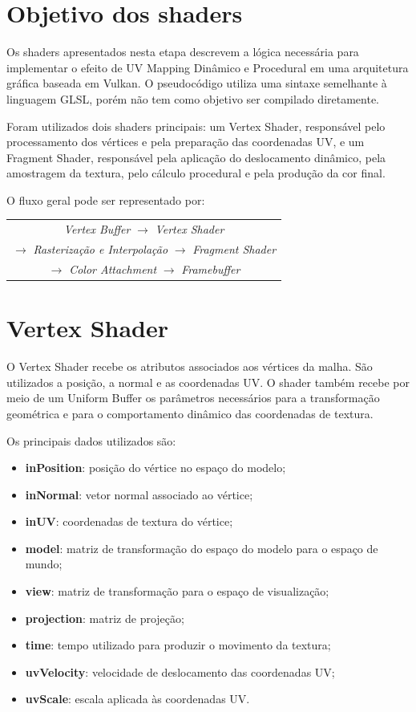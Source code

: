 \section{Objetivo dos shaders}

Os shaders apresentados nesta etapa descrevem a lógica necessária para
implementar o efeito de UV Mapping Dinâmico e Procedural em uma arquitetura
gráfica baseada em Vulkan. O pseudocódigo utiliza uma sintaxe semelhante à
linguagem GLSL, porém não tem como objetivo ser compilado diretamente.

Foram utilizados dois shaders principais: um Vertex Shader, responsável pelo
processamento dos vértices e pela preparação das coordenadas UV, e um
Fragment Shader, responsável pela aplicação do deslocamento dinâmico, pela
amostragem da textura, pelo cálculo procedural e pela produção da cor final.

O fluxo geral pode ser representado por:

\begin{center}
\begin{tabular}{c}
\textit{Vertex Buffer}
$\rightarrow$
\textit{Vertex Shader}
\\[0.2cm]
$\rightarrow$
\textit{Rasterização e Interpolação}
$\rightarrow$
\textit{Fragment Shader}
\\[0.2cm]
$\rightarrow$
\textit{Color Attachment}
$\rightarrow$
\textit{Framebuffer}
\end{tabular}
\end{center}


\section{Vertex Shader}

O Vertex Shader recebe os atributos associados aos vértices da malha. São
utilizados a posição, a normal e as coordenadas UV. O shader também recebe
por meio de um Uniform Buffer os parâmetros necessários para a transformação
geométrica e para o comportamento dinâmico das coordenadas de textura.

Os principais dados utilizados são:

\begin{itemize}
    \item \textbf{inPosition}: posição do vértice no espaço do modelo;
    \item \textbf{inNormal}: vetor normal associado ao vértice;
    \item \textbf{inUV}: coordenadas de textura do vértice;
    \item \textbf{model}: matriz de transformação do espaço do modelo para o
    espaço de mundo;
    \item \textbf{view}: matriz de transformação para o espaço de visualização;
    \item \textbf{projection}: matriz de projeção;
    \item \textbf{time}: tempo utilizado para produzir o movimento da textura;
    \item \textbf{uvVelocity}: velocidade de deslocamento das coordenadas UV;
    \item \textbf{uvScale}: escala aplicada às coordenadas UV.
\end{itemize}

